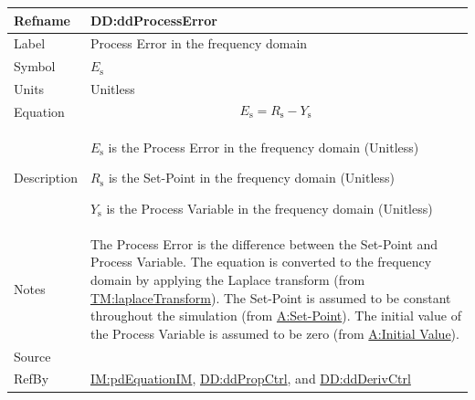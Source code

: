 \documentclass[12pt]{article}
\begin{document}
\medskip
\noindent
\begin{minipage}{\textwidth}
\begin{tabular}{>{\raggedright}p{}>{\raggedright\arraybackslash}p{}}
\toprule \textbf{Refname} & \textbf{DD:ddProcessError}
\label{DD:ddProcessError}
\\ \midrule
Label & Process Error in the frequency domain
        
\\ \midrule
Symbol & ${E_{\text{s}}}$
         
\\ \midrule
Units & Unitless
        
\\ \midrule
Equation & \begin{displaymath}
           {E_{\text{s}}}={R_{\text{s}}}-{Y_{\text{s}}}
           \end{displaymath}
\\ \midrule
Description & \begin{symbDescription}
              \item{${E_{\text{s}}}$ is the Process Error in the frequency domain (Unitless)}
              \item{${R_{\text{s}}}$ is the Set-Point in the frequency domain (Unitless)}
              \item{${Y_{\text{s}}}$ is the Process Variable in the frequency domain (Unitless)}
              \end{symbDescription}
\\ \midrule
Notes & The Process Error is the difference between the Set-Point and Process Variable. The equation is converted to the frequency domain by applying the Laplace transform (from \hyperref[TM:laplaceTransform]{TM:laplaceTransform}). The Set-Point is assumed to be constant throughout the simulation (from \hyperref[setPoint]{A:Set-Point}). The initial value of the Process Variable is assumed to be zero (from \hyperref[initialValue]{A:Initial Value}).
        
\\ \midrule
Source & \cite{johnson2008}
         
\\ \midrule
RefBy & \hyperref[IM:pdEquationIM]{IM:pdEquationIM}, \hyperref[DD:ddPropCtrl]{DD:ddPropCtrl}, and \hyperref[DD:ddDerivCtrl]{DD:ddDerivCtrl}
        
\\ \bottomrule
\end{tabular}
\end{minipage}
\end{document}

